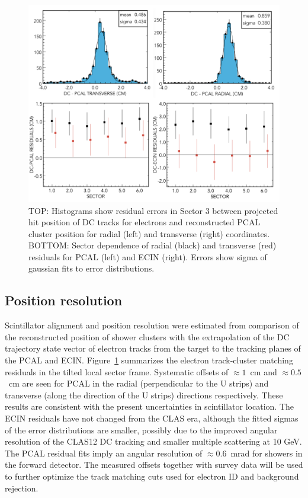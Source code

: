 \begin{figure}[hbt]
\centering
\includegraphics[width=1.0\columnwidth,keepaspectratio]{img/S10_1_3.png}
\caption[]{TOP: Histograms show residual errors in Sector 3 between projected hit position of DC tracks for electrons and reconstructed PCAL cluster position for radial (left) and transverse (right) coordinates. BOTTOM: Sector dependence of radial (black) and transverse (red) residuals for PCAL (left) and ECIN (right).  Errors show sigma of gaussian fits to error distributions.}
\label{fig:S10_1_3}
\end{figure}

\subsection{Position resolution}
Scintillator alignment and position resolution were estimated from comparison of the reconstructed position of shower clusters with the extrapolation of the DC trajectory state vector of electron tracks from the target to the tracking planes of the PCAL and ECIN.  
Figure~\ref{fig:S10_1_3} summarizes the electron track-cluster matching residuals in the tilted local sector frame.   Systematic offsets of $\approx 1$~cm and $\approx 0.5$ ~cm are seen for PCAL in the radial (perpendicular to the U strips) and transverse (along the direction of the U strips) directions respectively.  These results are consistent with the present uncertainties in scintillator location. The ECIN residuals have not changed from the CLAS era, although the fitted sigmas of the error distributions are smaller, possibly due to the improved angular resolution of the CLAS12 DC tracking and smaller multiple scattering at 10 GeV.  The PCAL residual fits imply an angular resolution of $\approx 0.6$~mrad for showers in the forward detector.  The measured offsets together with survey data will be used to further optimize the track matching cuts used for electron ID and background rejection. 

